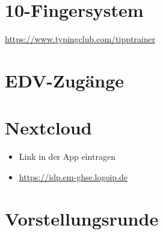 \documentclass{beamer}
\begin{document}
 \section{10-Fingersystem}
	\begin{frame}[plain]
\url{https://www.typingclub.com/tipptrainer}
\end{frame}


\section{EDV-Zugänge}

\section{Nextcloud}

\begin{frame}[plain]
\begin{itemize}
\item Link in der App eintragen
\item \url{https://idp.em-ghse.logoip.de}
\end{itemize}
\end{frame}


\section{Vorstellungsrunde}    
 
\end{document}
